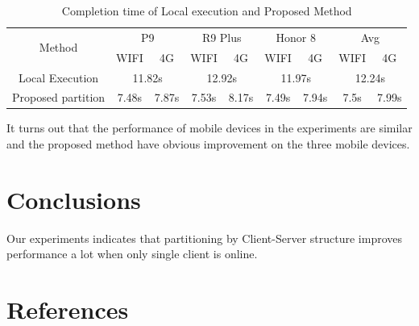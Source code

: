 \documentclass[a4paper,12pt,onecolumn,twoside]{article}
\begin{document}
\begin{CJK*}{GBK}{song}
  \begin{table}[!hbt]
    \caption{Completion time of Local execution and Proposed Method}
  \centering\label{tb:result}
    \begin{tabular}{|c|c|c|c|c|c|c|c|c|}
    \hline
    \multirow{2}{*}{Method} & \multicolumn{2}{c|}{P9}    & \multicolumn{2}{c|}{R9 Plus} & \multicolumn{2}{c|}{Honor 8} & \multicolumn{2}{c|}{Avg}   \\ \cline{2-9} 
                            & WIFI         & 4G          & WIFI          & 4G           & WIFI          & 4G           & WIFI         & 4G          \\ \hline
    Local Execution         & \multicolumn{2}{c|}{11.82s} & \multicolumn{2}{c|}{12.92s}   & \multicolumn{2}{c|}{11.97s}   & \multicolumn{2}{c|}{12.24s} \\ \hline
    Proposed partition      & 7.48s         & 7.87s        & 7.53s          & 8.17s         & 7.49s          & 7.94s        & 7.5s          & 7.99s       \\ \hline
    \end{tabular}
    \end{table}

It turns out that the performance of mobile devices in the experiments
are similar and the proposed method have obvious improvement 
on the three mobile devices.

\section{Conclusions}

Our experiments indicates that partitioning by Client-Server structure improves performance a lot when only single client is online.

\section{References}

\nocite{1508.06576}
\nocite{tensorflow2015-whitepaper}


 




\end{CJK*}
\end{document}
